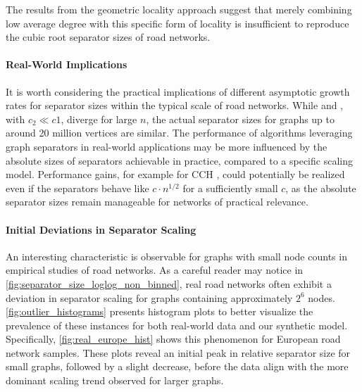 The results from the geometric locality approach suggest that merely combining low average degree with this specific form of locality is insufficient to reproduce the cubic root separator sizes of road networks.

\paragraph{Real-World Implications}

It is worth considering the practical implications of different asymptotic growth rates for separator sizes within the typical scale of road networks.
While  and , with \(c_2 \ll c1\), diverge for large \(n\), the actual separator sizes for graphs up to around 20 million vertices are similar.
The performance of algorithms leveraging graph separators in real-world applications may be more influenced by the absolute sizes of separators achievable in practice, compared to a specific scaling model.
Performance gains, for example for CCH \cite{dibbelt_customizable_2016}, could potentially be realized even if the separators behave like \(c \cdot n^{1/2}\) for a sufficiently small \(c\), as the absolute separator sizes remain manageable for networks of practical relevance.

\paragraph{Initial Deviations in Separator Scaling}

An interesting characteristic is observable for graphs with small node counts in empirical studies of road networks.
As a careful reader may notice in \cref{fig:separator_size_loglog_non_binned}, real road networks often exhibit a deviation in separator scaling for graphs containing approximately \(2^6\) nodes.
\cref{fig:outlier_histograms} presents histogram plots to better visualize the prevalence of these instances for both real-world data and our synthetic model.
Specifically, \cref{fig:real_europe_hist} shows this phenomenon for European road network samples.
These plots reveal an initial peak in relative separator size for small graphs, followed by a slight decrease, before the data align with the more dominant scaling trend observed for larger graphs.

